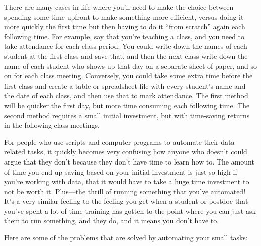 \documentclass[]{tufte-book}
\begin{document}
There are many cases in life where you'll need to make the choice between spending
some time upfront to make something more efficient, versus doing it more quickly the first
time but then having to do it ``from scratch'' again each following time. For example,
say that you're teaching a class, and you need to take attendance for each class period.
You could write down the names of each student at the first class and save that, and
then the next class write down the name of each student who shows up that day on a separate
sheet of paper, and so on for each class meeting. Conversely, you could take some extra
time before the first class and create a table or spreadsheet file with every student's
name and the date of each class, and then use that to mark attendance. The first method
will be quicker the first day, but more time consuming each following time. The second
method requires a small initial investment, but with time-saving returns in the following
class meetings.

For people who use scripts and computer programs to automate their data-related tasks,
it quickly becomes very confusing how anyone who doesn't could argue that they don't because
they don't have time to learn how to. The amount of time you end up saving based on your
initial investment is just so high if you're working with data, that it would have to take
a huge time investment to not be worth it. Plus---the thrill of running something that you've
automated! It's a very similar feeling to the feeling you get when a student or postdoc that
you've spent a lot of time training has gotten to the point where you can just ask them
to run something, and they do, and it means you don't have to.

Here are some of the problems that are solved by automating your small tasks:
\end{document}
